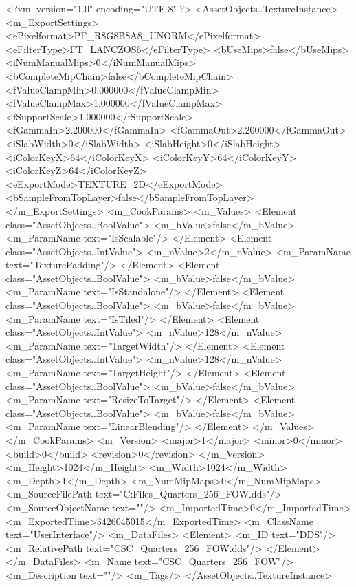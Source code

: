 <?xml version="1.0" encoding="UTF-8" ?>
<AssetObjects..TextureInstance>
	<m_ExportSettings>
		<ePixelformat>PF_R8G8B8A8_UNORM</ePixelformat>
		<eFilterType>FT_LANCZOS6</eFilterType>
		<bUseMips>false</bUseMips>
		<iNumManualMips>0</iNumManualMips>
		<bCompleteMipChain>false</bCompleteMipChain>
		<fValueClampMin>0.000000</fValueClampMin>
		<fValueClampMax>1.000000</fValueClampMax>
		<fSupportScale>1.000000</fSupportScale>
		<fGammaIn>2.200000</fGammaIn>
		<fGammaOut>2.200000</fGammaOut>
		<iSlabWidth>0</iSlabWidth>
		<iSlabHeight>0</iSlabHeight>
		<iColorKeyX>64</iColorKeyX>
		<iColorKeyY>64</iColorKeyY>
		<iColorKeyZ>64</iColorKeyZ>
		<eExportMode>TEXTURE_2D</eExportMode>
		<bSampleFromTopLayer>false</bSampleFromTopLayer>
	</m_ExportSettings>
	<m_CookParams>
		<m_Values>
			<Element class="AssetObjects..BoolValue">
				<m_bValue>false</m_bValue>
				<m_ParamName text="IsScalable"/>
			</Element>
			<Element class="AssetObjects..IntValue">
				<m_nValue>2</m_nValue>
				<m_ParamName text="TexturePadding"/>
			</Element>
			<Element class="AssetObjects..BoolValue">
				<m_bValue>false</m_bValue>
				<m_ParamName text="IsStandalone"/>
			</Element>
			<Element class="AssetObjects..BoolValue">
				<m_bValue>false</m_bValue>
				<m_ParamName text="IsTiled"/>
			</Element>
			<Element class="AssetObjects..IntValue">
				<m_nValue>128</m_nValue>
				<m_ParamName text="TargetWidth"/>
			</Element>
			<Element class="AssetObjects..IntValue">
				<m_nValue>128</m_nValue>
				<m_ParamName text="TargetHeight"/>
			</Element>
			<Element class="AssetObjects..BoolValue">
				<m_bValue>false</m_bValue>
				<m_ParamName text="ResizeToTarget"/>
			</Element>
			<Element class="AssetObjects..BoolValue">
				<m_bValue>false</m_bValue>
				<m_ParamName text="LinearBlending"/>
			</Element>
		</m_Values>
	</m_CookParams>
	<m_Version>
		<major>1</major>
		<minor>0</minor>
		<build>0</build>
		<revision>0</revision>
	</m_Version>
	<m_Height>1024</m_Height>
	<m_Width>1024</m_Width>
	<m_Depth>1</m_Depth>
	<m_NumMipMaps>0</m_NumMipMaps>
	<m_SourceFilePath text="C:\Users\Shadow\Desktop\Working Files\Icons\Quarters\CSC_Quarters_256_FOW.dds"/>
	<m_SourceObjectName text=""/>
	<m_ImportedTime>0</m_ImportedTime>
	<m_ExportedTime>3426045015</m_ExportedTime>
	<m_ClassName text="UserInterface"/>
	<m_DataFiles>
		<Element>
			<m_ID text="DDS"/>
			<m_RelativePath text="CSC_Quarters_256_FOW.dds"/>
		</Element>
	</m_DataFiles>
	<m_Name text="CSC_Quarters_256_FOW"/>
	<m_Description text=""/>
	<m_Tags/>
</AssetObjects..TextureInstance>

